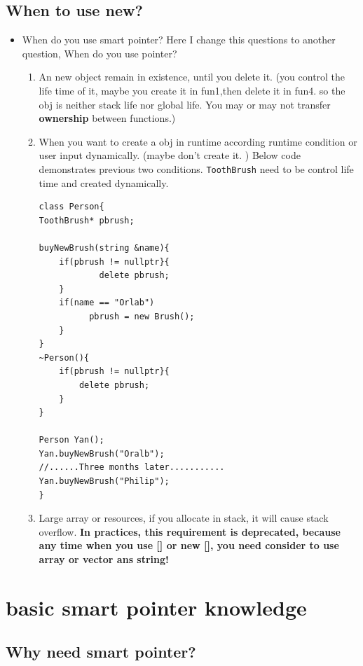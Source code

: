 \documentclass[a4paper,11pt,twoside]{book}
\begin{document}
\subsection{When to use new?}
\begin{itemize}

\item When do you use smart pointer? Here I change this questions to another question, When do you use pointer?
\begin{enumerate}

\item An new object remain in existence, until you delete it. (you control the life time of it, maybe you create it in fun1,then delete it in fun4. so the obj is neither stack life nor global life. You may or may not transfer \textbf{ownership} between functions.)

\item When you want to create a obj in runtime according runtime condition or user input dynamically. (maybe don't create it. ) Below code demonstrates previous two conditions.  \texttt{ToothBrush} need to be control life time and created dynamically.

\begin{lstlisting}[numbers=none]
class Person{
ToothBrush* pbrush;

buyNewBrush(string &name){
    if(pbrush != nullptr}{
	    	delete pbrush;
    }
    if(name == "Orlab")
          pbrush = new Brush();
    }
}
~Person(){
	if(pbrush != nullptr}{
		delete pbrush;
    }
}

Person Yan();
Yan.buyNewBrush("Oralb");
//......Three months later...........
Yan.buyNewBrush("Philip");
}
\end{lstlisting}

\item Large array or resources,  if you allocate in stack, it will cause stack overflow. \textbf{In practices, this requirement is deprecated, because any time when you use [] or new [], you need consider to use array or vector ans string!}
\end{enumerate}

\end{itemize}

\section{basic smart pointer knowledge}

\subsection{Why need smart pointer?}
\end{document}
